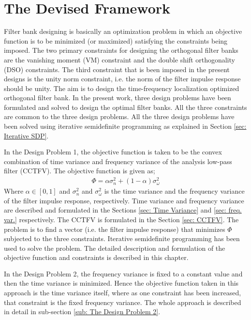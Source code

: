 \chapter{\label{Chap: The Orthogonal Design}The Devised Framework}
Filter bank designing is basically an optimization problem in which an objective function is to be minimized (or maximized) satisfying the constraints being imposed. The two primary constraints for designing the orthogonal filter banks are the vanishing moment (VM) constraint and the double shift orthogonality (DSO) constraints. The third constraint that is been imposed in the present designs is the unity norm constraint, i.e. the norm of the filter impulse response should be unity. The aim is to design the time-frequency localization optimized orthogonal filter bank. In the present work, three design problems have been formulated and solved to design the optimal filter banks. All the three constraints are common to the three design problems. All the three design problems have been solved using iterative semidefinite programming as explained in Section \ref{sec: Iterative SDP}.

In the Design Problem 1, the objective function is taken to be the convex combination of time variance and frequency variance of the analysis low-pass filter (CCTFV). The objective function is given as;
\begin{eqnarray}
\label{eq: CCTFV}
\Phi = \alpha \sigma_n^2 + (1-\alpha)\sigma_{\omega}^{2} 
\end{eqnarray}
Where $\alpha \in [0,1]$ and $\sigma_n^2$ and $\sigma_{\omega}^{2}$ is the time variance and the frequency variance of the filter impulse response, respectively. Time variance and frequency variance are described and formulated in the Sections \ref{sec: Time Variance} and \ref{sec: freq. var.} respectively. The CCTFV is formulated in the Section \ref{sec: CCTFV}. The problem is to find a vector (i.e. the filter impulse response) that minimizes $\Phi$ subjected to the three constraints. Iterative semidefinite programming has been used to solve the problem. The detailed description and formulation of the objective function and constraints is described in this chapter.

In the Design Problem 2, the frequency variance is fixed to a constant value and then the time variance is minimized. Hence the objective function taken in this approach is the time variance itself, where as one constraint has been increased, that constraint is the fixed frequency variance. The whole approach is described in detail in sub-section \ref{sub: The Design Problem 2}.

